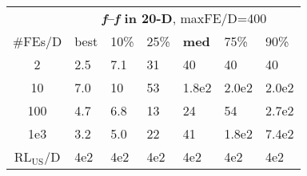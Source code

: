 \begin{tabular}{c|llllll}
 & \multicolumn{6}{|c}{\textbf{\textit{f}\raisebox{-0.35ex}{1}--\textit{f}\raisebox{-0.35ex}{24} in 20-D}, maxFE/D=400}\\
\#FEs/D & best & 10\% & 25\% & \textbf{med} & 75\% & 90\%\\
2 & \hspace*{1ex}2.5 & \hspace*{1ex}7.1 & 31 & 40 & 40 & 40\\
10 & \hspace*{1ex}7.0 & 10 & 53 & 1.8e2 & 2.0e2 & 2.0e2\\
100 & \hspace*{1ex}4.7 & \hspace*{1ex}6.8 & 13 & 24 & 54 & 2.7e2\\
1e3 & \hspace*{1ex}3.2 & \hspace*{1ex}5.0 & 22 & 41 & 1.8e2 & 7.4e2\\
$\text{RL}_{\text{US}}$/D & 4e2 & 4e2 & 4e2 & 4e2 & 4e2 & 4e2
\end{tabular}

